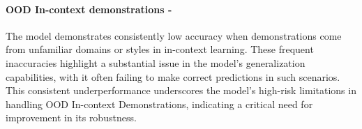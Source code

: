 \paragraph{OOD In-context demonstrations - \high}
The model demonstrates consistently low accuracy when demonstrations come from unfamiliar domains or styles in in-context learning. These frequent inaccuracies highlight a substantial issue in the model's generalization capabilities, with it often failing to make correct predictions in such scenarios. This consistent underperformance underscores the model's high-risk limitations in handling OOD In-context Demonstrations, indicating a critical need for improvement in its robustness.